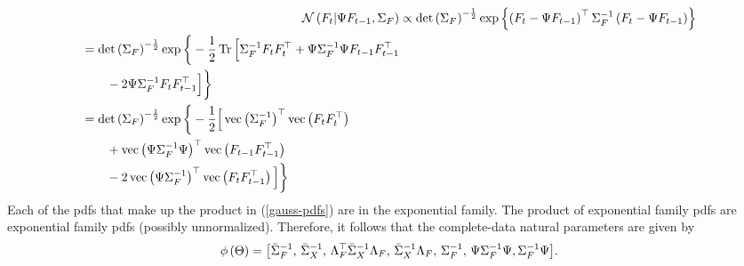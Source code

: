 \begin{align}
	\mathcal N \left( F_t | \Psi F_{t-1}, \Sigma_F \right)	&\propto \det \left( \Sigma_F \right)^{-\frac12} \exp \left\{ \left( F_t - \Psi F_{t-1} \right)^{\top} \Sigma_F^{-1} \left( F_t - \Psi F_{t-1} \right) \right\} \nonumber \\
	\begin{split}
		&= \det \left( \Sigma_F \right)^{-\frac12} \exp \bigg\{ -\frac12 \operatorname{Tr} \Big[ \Sigma_F^{-1}  F_t F_t ^{\top} + \Psi \Sigma_F^{-1} \Psi F_{t-1} F_{t-1}^{\top} \\
		&\qquad - 2 \Psi \Sigma_F^{-1} F_t F_{t-1}^{\top} \Big] \bigg\} \\
		&= \det \left( \Sigma_F \right)^{-\frac12} \exp \bigg\{ -\frac12 \Big[ \operatorname{vec} \left( \Sigma_F^{-1} \right)^{\top} \operatorname{vec} \left( F_t F_t^{\top} \right) \\
		&\qquad + \operatorname{vec} \left( \Psi \Sigma_F^{-1} \Psi \right)^{\top} \operatorname{vec} \left( F_{t-1} F_{t-1}^{\top} \right) \\
		&\qquad -2 \operatorname{vec} \left( \Psi \Sigma_F^{-1} \right)^{\top} \operatorname{vec} \left( F_t F_{t-1}^{\top} \right) \Big] \bigg\}
	\end{split}
\end{align}
Each of the pdfs that make up the product in (\ref{gauss-pdfs}) are in the exponential family. The product of exponential family pdfs are exponential family pdfs (possibly unnormalized). Therefore, it follows that the complete-data natural parameters are given by
\begin{equation}
	\phi \left( \Theta \right) = \mleft[ \bar{\Sigma}_F^{-1},\, \bar{\Sigma}_X^{-1},\, \Lambda_F^{\top} \bar{\Sigma}_X^{-1} \Lambda_F,\, \bar{\Sigma}_X^{-1} \Lambda_F,\, \Sigma_F^{-1},\, \Psi \Sigma_F^{-1} \Psi, \Sigma_F^{-1} \Psi \mright].
\end{equation}


